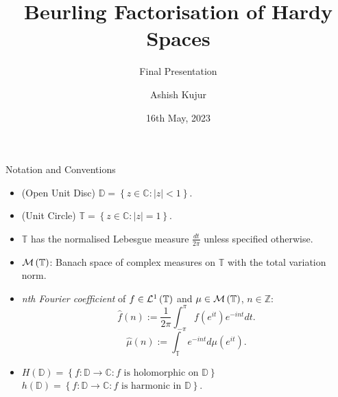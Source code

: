\documentclass{beamer}
\title{Beurling Factorisation of Hardy Spaces}
\subtitle{Final Presentation}
\author{Ashish Kujur}
\date{16th May, 2023}
\numberwithin{equation}{subsection}
\newcommand{\Z}{\mathbb Z}
\newcommand{\C}{\mathbb C}
\newcommand{\D}{\mathbb D}
\newcommand{\T}{\mathbb T}
\newcommand{\calL}{{\cal L}}
\newcommand{\calM}{{\cal M}}
\newcommand{\abs}[1]{\left\lvert #1 \right\rvert}
\begin{document}
 \begin{frame}
   \maketitle
 \end{frame}


 \begin{frame}{Notation and Conventions}
     \begin{itemize}
	     \pause
	 \item (Open Unit Disc) $\D = \left\{ z\in \C : \abs{z} < 1 \right\}$.
	     \pause
	 \item (Unit Circle) $\T = \left\{ z\in \C : \abs{z}=1 \right\}$.
	     \pause
	 \item $\T$ has the normalised Lebesgue measure $\frac{dt}{2\pi}$ unless specified otherwise.
\pause
	 \item $\calM \left( \T \right)$: Banach space of complex measures on $\T$ with the total variation norm.
	     \pause
	 \item \textit{nth Fourier coefficient} of $f\in \calL ^{1}\left( \T \right)$ and $\mu \in \calM \left( \T \right)$, $n\in \Z$:
	     \begin{equation*}
		 \hat{f}(n) := \frac{1}{2\pi} \int_{-\pi}^{\pi} f\left( e^{it} \right) e^{-int} dt.
	     \end{equation*}
	     \begin{equation*}
		 \hat{\mu} \left( n \right) := \int_{\T} e^{-int} d\mu \left( e^{it} \right).
	     \end{equation*}
	     \pause
	 \item $H\left( \D \right) = \left\{ f : \D \to \C : f \text{ is holomorphic on } \D \right\}$ \\
	     $h\left( \D \right) = \left\{ f: \D \to \C : f \text{ is harmonic in } \D \right\}$.
     \end{itemize}
 \end{frame}
\end{document}
